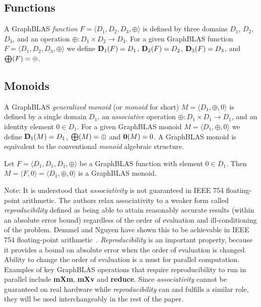 \documentclass[11pt]{extarticle}
\begin{document}
\subsection{Functions}

A GraphBLAS \emph{function} $F = \langle D_1,D_2,D_3,\oplus \rangle$
is defined by three domains $D_1$, $D_2$, $D_3$, and an operation
$\oplus: D_1 \times D_2 \rightarrow D_3$.  For a given GraphBLAS function
$F=\langle D_1, D_2, D_3,\oplus \rangle$ we define $\bold{D}_1(F) = D_1$,
$\bold{D}_2(F) = D_2$, $\bold{D}_3(F) = D_3$, and $\bold{\bigoplus}(F)
= \oplus$.

\subsection{Monoids}

A GraphBLAS \emph{generalized monoid} (or \emph{monoid} for short) $M =
\langle D_1,\oplus,0 \rangle$ is defined by a single domain $D_1$, an 
\emph{associative} operation $\oplus: D_1 \times D_1 \rightarrow D_1$,
and an identity element $0 \in D_1$.  For a given GraphBLAS monoid $M=\langle
D_1,\oplus,0 \rangle$ we define $\bold{D}_1(M) = D_1$, $\bold{\bigoplus}(M) =
\oplus$ and $\bold{0}(M) = 0$.  A GraphBLAS monoid is equivalent to 
the conventional \emph{monoid} algebraic structure.

Let $F = \langle D_1,D_1,D_1,\oplus \rangle$ be a GraphBLAS function
with element $0 \in D_1$.  Then $M = \langle F,0 \rangle = \langle
D_1,\oplus,0 \rangle$ is a GraphBLAS monoid.

Note: It is understood that \emph{associativity} is not guaranteed in IEEE 754 floating-point arithmetic. The authors relax associativity to a weaker form called \emph{reproducibility} defined as being able to attain reasonably accurate results (within an absolute error bound) regardless of the order of evaluation and ill-conditioning of the problem. Demmel and Nguyen have shown this to be achievable in IEEE 754 floating-point arithmetic~\cite{Demmel:2013:FRF}. \emph{Reproducibility} is an important property, because it provides a bound on absolute error when the order of evaluation is changed. Ability to change the order of evaluation is a must for parallel computation. Examples of key GraphBLAS operations that require reproducibility to run in parallel include {\mbox{\bf mXm}}, {\mbox{\bf mXv}} and {\mbox{\bf reduce}}. Since \emph{associativity} cannot be guaranteed on real hardware while \emph{reproducibility} can and fulfills a similar role, they will be used interchangeably in the rest of the paper. 
\end{document}
